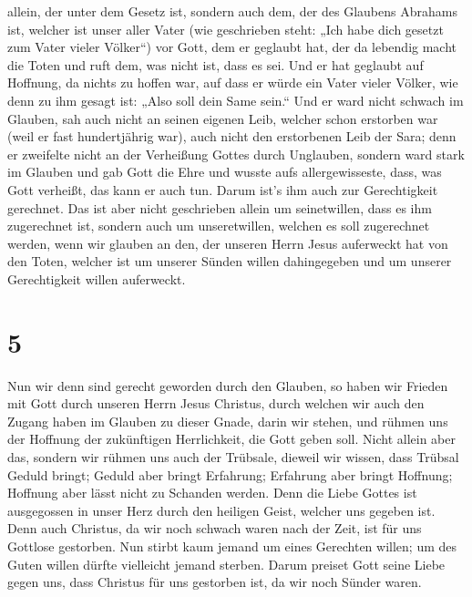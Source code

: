 allein, der unter dem Gesetz ist, sondern auch dem, der des Glaubens
Abrahams ist, welcher ist unser aller Vater  (wie
geschrieben steht: „Ich habe dich gesetzt zum Vater vieler Völker``) vor
Gott, dem er geglaubt hat, der da lebendig macht die Toten und ruft dem,
was nicht ist, dass es sei.  Und er hat geglaubt auf
Hoffnung, da nichts zu hoffen war, auf dass er würde ein Vater vieler
Völker, wie denn zu ihm gesagt ist: „Also soll dein Same sein.``
 Und er ward nicht schwach im Glauben, sah auch nicht an
seinen eigenen Leib, welcher schon erstorben war (weil er fast
hundertjährig war), auch nicht den erstorbenen Leib der Sara;
 denn er zweifelte nicht an der Verheißung Gottes durch
Unglauben, sondern ward stark im Glauben und gab Gott die Ehre
 und wusste aufs allergewisseste, dass, was Gott
verheißt, das kann er auch tun.  Darum ist's ihm auch zur
Gerechtigkeit gerechnet.  Das ist aber nicht geschrieben
allein um seinetwillen, dass es ihm zugerechnet ist, 
sondern auch um unseretwillen, welchen es soll zugerechnet werden, wenn
wir glauben an den, der unseren Herrn Jesus auferweckt hat von den
Toten,  welcher ist um unserer Sünden willen dahingegeben
und um unserer Gerechtigkeit willen auferweckt.

\hypertarget{section-4}{%
\section{5}\label{section-4}}

 Nun wir denn sind gerecht geworden durch den Glauben, so
haben wir Frieden mit Gott durch unseren Herrn Jesus Christus,
 durch welchen wir auch den Zugang haben im Glauben zu
dieser Gnade, darin wir stehen, und rühmen uns der Hoffnung der
zukünftigen Herrlichkeit, die Gott geben soll.  Nicht
allein aber das, sondern wir rühmen uns auch der Trübsale, dieweil wir
wissen, dass Trübsal Geduld bringt;  Geduld aber bringt
Erfahrung; Erfahrung aber bringt Hoffnung;  Hoffnung aber
lässt nicht zu Schanden werden. Denn die Liebe Gottes ist ausgegossen in
unser Herz durch den heiligen Geist, welcher uns gegeben ist.
 Denn auch Christus, da wir noch schwach waren nach der
Zeit, ist für uns Gottlose gestorben.  Nun stirbt kaum
jemand um eines Gerechten willen; um des Guten willen dürfte vielleicht
jemand sterben.  Darum preiset Gott seine Liebe gegen uns,
dass Christus für uns gestorben ist, da wir noch Sünder waren.

